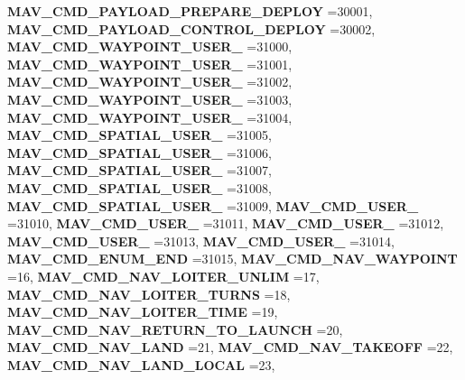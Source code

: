 \begin{DoxyCompactItemize}
\textbf{ M\+A\+V\+\_\+\+C\+M\+D\+\_\+\+P\+A\+Y\+L\+O\+A\+D\+\_\+\+P\+R\+E\+P\+A\+R\+E\+\_\+\+D\+E\+P\+L\+OY} =30001, 
\textbf{ M\+A\+V\+\_\+\+C\+M\+D\+\_\+\+P\+A\+Y\+L\+O\+A\+D\+\_\+\+C\+O\+N\+T\+R\+O\+L\+\_\+\+D\+E\+P\+L\+OY} =30002, 
\newline
\textbf{ M\+A\+V\+\_\+\+C\+M\+D\+\_\+\+W\+A\+Y\+P\+O\+I\+N\+T\+\_\+\+U\+S\+E\+R\+\_} =31000, 
\textbf{ M\+A\+V\+\_\+\+C\+M\+D\+\_\+\+W\+A\+Y\+P\+O\+I\+N\+T\+\_\+\+U\+S\+E\+R\+\_} =31001, 
\textbf{ M\+A\+V\+\_\+\+C\+M\+D\+\_\+\+W\+A\+Y\+P\+O\+I\+N\+T\+\_\+\+U\+S\+E\+R\+\_} =31002, 
\textbf{ M\+A\+V\+\_\+\+C\+M\+D\+\_\+\+W\+A\+Y\+P\+O\+I\+N\+T\+\_\+\+U\+S\+E\+R\+\_} =31003, 
\newline
\textbf{ M\+A\+V\+\_\+\+C\+M\+D\+\_\+\+W\+A\+Y\+P\+O\+I\+N\+T\+\_\+\+U\+S\+E\+R\+\_} =31004, 
\textbf{ M\+A\+V\+\_\+\+C\+M\+D\+\_\+\+S\+P\+A\+T\+I\+A\+L\+\_\+\+U\+S\+E\+R\+\_} =31005, 
\textbf{ M\+A\+V\+\_\+\+C\+M\+D\+\_\+\+S\+P\+A\+T\+I\+A\+L\+\_\+\+U\+S\+E\+R\+\_} =31006, 
\textbf{ M\+A\+V\+\_\+\+C\+M\+D\+\_\+\+S\+P\+A\+T\+I\+A\+L\+\_\+\+U\+S\+E\+R\+\_} =31007, 
\newline
\textbf{ M\+A\+V\+\_\+\+C\+M\+D\+\_\+\+S\+P\+A\+T\+I\+A\+L\+\_\+\+U\+S\+E\+R\+\_} =31008, 
\textbf{ M\+A\+V\+\_\+\+C\+M\+D\+\_\+\+S\+P\+A\+T\+I\+A\+L\+\_\+\+U\+S\+E\+R\+\_} =31009, 
\textbf{ M\+A\+V\+\_\+\+C\+M\+D\+\_\+\+U\+S\+E\+R\+\_} =31010, 
\textbf{ M\+A\+V\+\_\+\+C\+M\+D\+\_\+\+U\+S\+E\+R\+\_} =31011, 
\newline
\textbf{ M\+A\+V\+\_\+\+C\+M\+D\+\_\+\+U\+S\+E\+R\+\_} =31012, 
\textbf{ M\+A\+V\+\_\+\+C\+M\+D\+\_\+\+U\+S\+E\+R\+\_} =31013, 
\textbf{ M\+A\+V\+\_\+\+C\+M\+D\+\_\+\+U\+S\+E\+R\+\_} =31014, 
\textbf{ M\+A\+V\+\_\+\+C\+M\+D\+\_\+\+E\+N\+U\+M\+\_\+\+E\+ND} =31015, 
\newline
\textbf{ M\+A\+V\+\_\+\+C\+M\+D\+\_\+\+N\+A\+V\+\_\+\+W\+A\+Y\+P\+O\+I\+NT} =16, 
\textbf{ M\+A\+V\+\_\+\+C\+M\+D\+\_\+\+N\+A\+V\+\_\+\+L\+O\+I\+T\+E\+R\+\_\+\+U\+N\+L\+IM} =17, 
\textbf{ M\+A\+V\+\_\+\+C\+M\+D\+\_\+\+N\+A\+V\+\_\+\+L\+O\+I\+T\+E\+R\+\_\+\+T\+U\+R\+NS} =18, 
\textbf{ M\+A\+V\+\_\+\+C\+M\+D\+\_\+\+N\+A\+V\+\_\+\+L\+O\+I\+T\+E\+R\+\_\+\+T\+I\+ME} =19, 
\newline
\textbf{ M\+A\+V\+\_\+\+C\+M\+D\+\_\+\+N\+A\+V\+\_\+\+R\+E\+T\+U\+R\+N\+\_\+\+T\+O\+\_\+\+L\+A\+U\+N\+CH} =20, 
\textbf{ M\+A\+V\+\_\+\+C\+M\+D\+\_\+\+N\+A\+V\+\_\+\+L\+A\+ND} =21, 
\textbf{ M\+A\+V\+\_\+\+C\+M\+D\+\_\+\+N\+A\+V\+\_\+\+T\+A\+K\+E\+O\+FF} =22, 
\textbf{ M\+A\+V\+\_\+\+C\+M\+D\+\_\+\+N\+A\+V\+\_\+\+L\+A\+N\+D\+\_\+\+L\+O\+C\+AL} =23, 

\end{DoxyCompactItemize}
